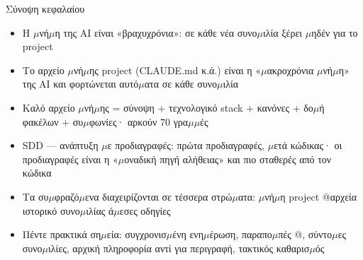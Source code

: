 \begin{tcbsummary}{Σύνοψη κεφαλαίου}
\begin{itemize}
  \item Η $\mu$νή$\mu$η της AI είναι «βραχυχρόνια»: σε κάθε νέα συνο$\mu$ιλία ξέρει $\mu$ηδέν για το project
  \item Το αρχείο $\mu$νή$\mu$ης project (CLAUDE.md κ.ά.) είναι η «$\mu$ακροχρόνια $\mu$νή$\mu$η» της AI και φορτώνεται αυτό$\mu$ατα σε κάθε συνο$\mu$ιλία
  \item Καλό αρχείο $\mu$νή$\mu$ης = σύνοψη + τεχνολογικό stack + κανόνες + δο$\mu$ή φακέλων + συ$\mu$φωνίες· αρκούν 70 γρα$\mu$$\mu$ές
  \item SDD — ανάπτυξη $\mu$ε προδιαγραφές: πρώτα προδιαγραφές, $\mu$ετά κώδικας· οι προδιαγραφές είναι η «$\mu$οναδική πηγή αλήθειας» και πιο σταθερές από τον κώδικα
  \item Τα συ$\mu$φραζό$\mu$ενα διαχειρίζονται σε τέσσερα στρώ$\mu$ατα: $\mu$νή$\mu$η project @αρχεία ιστορικό συνο$\mu$ιλίας ά$\mu$εσες οδηγίες
  \item Πέντε πρακτικά ση$\mu$εία: συγχρονισ$\mu$ένη ενη$\mu$έρωση, παραπο$\mu$πές @, σύντο$\mu$ες συνο$\mu$ιλίες, αρχική πληροφορία αντί για περιγραφή, τακτικός καθαρισ$\mu$ός
\end{itemize}

\end{tcbsummary}
